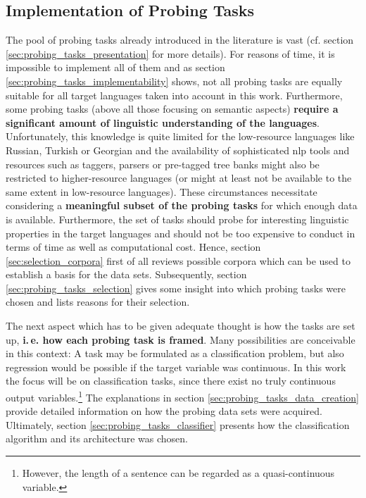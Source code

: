\subsection{Implementation of Probing Tasks}
\label{sec:probing_tasks_implementation}

The pool of probing tasks already introduced in the literature is vast (cf. section \vref{sec:probing_tasks_presentation} for more details). For reasons of time, it is impossible to implement all of them and as section \vref{sec:probing_tasks_implementability} shows, not all probing tasks are equally suitable for all target languages taken into account in this work. Furthermore, some probing tasks (above all those focusing on semantic aspects) \textbf{require a significant amount of linguistic understanding of the languages}. Unfortunately, this knowledge is quite limited for the low-resource languages like Russian, Turkish or Georgian and the availability of sophisticated \gls{nlp} tools and resources such as taggers, parsers or pre-tagged tree banks might also be restricted to higher-resource languages (or might at least not be available to the same extent in low-resource languages). These circumstances necessitate considering a \textbf{meaningful subset of the probing tasks} for which enough data is available. Furthermore, the set of tasks should probe for interesting linguistic properties in the target languages and should not be too expensive to conduct in terms of time as well as computational cost. Hence, section \vref{sec:selection_corpora} first of all reviews possible corpora which can be used to establish a basis for the data sets. Subsequently, section \vref{sec:probing_tasks_selection} gives some insight into which probing tasks were chosen and lists reasons for their selection.

The next aspect which has to be given adequate thought is how the tasks are set up, \textbf{i.\,e. how each probing task is framed}. Many possibilities are conceivable in this context: A task may be formulated as a classification problem, but also regression would be possible if the target variable was continuous. In this work the focus will be on classification tasks, since there exist no truly continuous output variables.\footnote{However, the length of a sentence can be regarded as a quasi-continuous variable.} The explanations in section \vref{sec:probing_tasks_data_creation} provide detailed information on how the probing data sets were acquired. Ultimately, section \vref{sec:probing_tasks_classifier} presents how the classification algorithm and its architecture was chosen.

